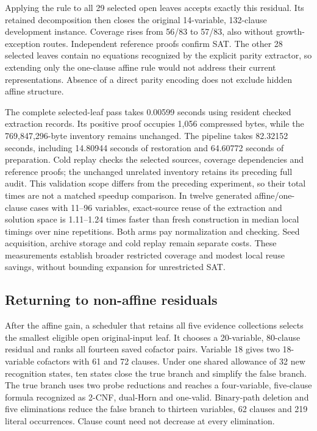 \documentclass[11pt,a4paper]{article}
\numberwithin{equation}{section}
\theoremstyle{plain}
\theoremstyle{definition}
\theoremstyle{remark}
\begin{document}
Applying the rule to all 29 selected open leaves accepts exactly this residual. Its retained decomposition then closes the original 14-variable, 132-clause development instance. Coverage rises from 56/83 to 57/83, also without growth-exception routes. Independent reference proofs confirm SAT. The other 28 selected leaves contain no equations recognized by the explicit parity extractor, so extending only the one-clause affine rule would not address their current representations. Absence of a direct parity encoding does not exclude hidden affine structure.

The complete selected-leaf pass takes 0.00599 seconds using resident checked extraction records. Its positive proof occupies 1,056 compressed bytes, while the 769,847,296-byte inventory remains unchanged. The pipeline takes 82.32152 seconds, including 14.80944 seconds of restoration and 64.60772 seconds of preparation. Cold replay checks the selected sources, coverage dependencies and reference proofs; the unchanged unrelated inventory retains its preceding full audit. This validation scope differs from the preceding experiment, so their total times are not a matched speedup comparison. In twelve generated affine/one-clause cases with 11--96 variables, exact-source reuse of the extraction and solution space is 1.11--1.24 times faster than fresh construction in median local timings over nine repetitions. Both arms pay normalization and checking. Seed acquisition, archive storage and cold replay remain separate costs. These measurements establish broader restricted coverage and modest local reuse savings, without bounding expansion for unrestricted SAT.

\subsection{Returning to non-affine residuals}

After the affine gain, a scheduler that retains all five evidence collections selects the smallest eligible open original-input leaf. It chooses a 20-variable, 80-clause residual and ranks all fourteen saved cofactor pairs. Variable 18 gives two 18-variable cofactors with 61 and 72 clauses. Under one shared allowance of 32 new recognition states, ten states close the true branch and simplify the false branch. The true branch uses two probe reductions and reaches a four-variable, five-clause formula recognized as 2-CNF, dual-Horn and one-valid. Binary-path deletion and five eliminations reduce the false branch to thirteen variables, 62 clauses and 219 literal occurrences. Clause count need not decrease at every elimination.
\end{document}
